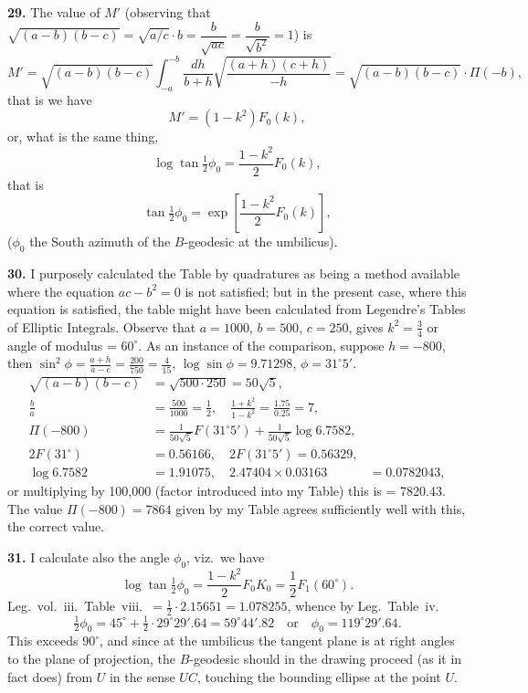 \documentclass[11pt,a4paper]{article}
\begin{document}
\noindent\textbf{29.} The value of $M'$ (observing that $\sqrt{(a-b)(b-c)} = \sqrt{a/c} \cdot b = \dfrac{b}{\sqrt{ac}} = \dfrac{b}{\sqrt{b^{2}}} = 1$) is
\[
M' = \sqrt{(a-b)(b-c)} \int_{-a}^{-b} \frac{dh}{b+h} \sqrt{\frac{(a+h)(c+h)}{-h}} = \sqrt{(a-b)(b-c)} \cdot \Pi(-b),
\]
that is we have
\[
M' = (1-k^{2}) F_{0}(k),
\]
or, what is the same thing,
\[
\log \tan \tfrac{1}{2}\phi_{0} = \frac{1-k^{2}}{2} F_{0}(k),
\]
that is
\[
\tan \tfrac{1}{2}\phi_{0} = \exp\left[ \frac{1-k^{2}}{2} F_{0}(k) \right],
\]
($\phi_{0}$ the South azimuth of the $B$-geodesic at the umbilicus).

\noindent\textbf{30.} I purposely calculated the Table by quadratures as being a method available where the equation $ac - b^{2} = 0$ is not satisfied; but in the present case, where this equation is satisfied, the table might have been calculated from Legendre's Tables of Elliptic Integrals. Observe that $a = 1000$, $b = 500$, $c = 250$, gives $k^{2} = \tfrac{3}{4}$ or angle of modulus = $60^{\circ}$. As an instance of the comparison, suppose $h = -800$, then $\sin^{2}\phi = \tfrac{a+h}{a-c} = \tfrac{200}{750} = \tfrac{4}{15}$, $\log \sin\phi = 9.71298$, $\phi = 31^{\circ}5'$.
\begin{align*}
\sqrt{(a-b)(b-c)} &= \sqrt{500 \cdot 250} = 50\sqrt{5}, \\
\frac{b}{a} &= \frac{500}{1000} = \frac{1}{2}, \quad \frac{1+k^{2}}{1-k^{2}} = \frac{1.75}{0.25} = 7, \\
\Pi(-800) &= \frac{1}{50\sqrt{5}} F(31^{\circ}5') + \frac{1}{50\sqrt{5}} \log 6.7582, \\
2F(31^{\circ}) &= 0.56166, \quad 2F(31^{\circ}5') = 0.56329, \\
\log 6.7582 &= 1.91075, \quad 2.47404 \times 0.03163 &= 0.0782043,
\end{align*}
or multiplying by 100,000 (factor introduced into my Table) this is = 7820.43. The value $\Pi(-800) = 7864$ given by my Table agrees sufficiently well with this, the correct value.

\noindent\textbf{31.} I calculate also the angle $\phi_{0}$, viz.\ we have
\[
\log \tan \tfrac{1}{2}\phi_{0} = \frac{1-k^{2}}{2} F_{0}K_{0} = \frac{1}{2} F_{1}(60^{\circ}).
\]
Leg.\ vol.~iii.\ Table~viii.\ $= \tfrac{1}{2} \cdot 2.15651 = 1.078255$, whence by Leg.\ Table~iv.
\[
\tfrac{1}{2}\phi_{0} = 45^{\circ} + \tfrac{1}{2} \cdot 29^{\circ}29'.64 = 59^{\circ}44'.82 \quad \text{or} \quad \phi_{0} = 119^{\circ}29'.64.
\]
This exceeds $90^{\circ}$, and since at the umbilicus the tangent plane is at right angles to the plane of projection, the $B$-geodesic should in the drawing proceed (as it in fact does) from $U$ in the sense $UC$, touching the bounding ellipse at the point $U$.
\end{document}
